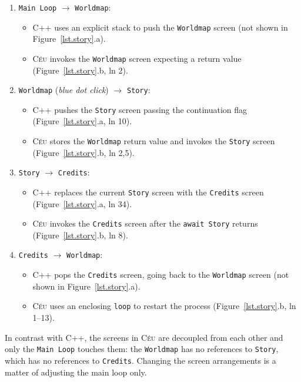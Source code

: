 \documentclass[times,twocolumn,final]{elsarticle}
\newcommand{\CEU}{\textsc{C\'{e}u}\xspace}
\newcommand{\code}[1] {{\small{\texttt{#1}}}}
\begin{document}
\begin{enumerate}
\item \code{Main Loop} $\longrightarrow$ \code{Worldmap}:
    \begin{itemize}
    \item C++ uses an explicit stack to push the \code{Worldmap} screen (not
          shown in Figure~\ref{lst.story}.a).
    \item \CEU invokes the \code{Worldmap} screen expecting a return value
          (Figure~\ref{lst.story}.b, ln 2).
    \end{itemize}
\item \code{Worldmap} (\emph{blue dot click}) $\longrightarrow$ \code{Story}:
    \begin{itemize}
    \item C++ pushes the \code{Story} screen passing the continuation flag
          (Figure~\ref{lst.story}.a, ln 10).
    \item \CEU stores the \code{Worldmap} return value and invokes the \code{Story} screen
          (Figure~\ref{lst.story}.b, ln 2,5).
    \end{itemize}
\item \code{Story} $\longrightarrow$ \code{Credits}:
    \begin{itemize}
    \item C++ replaces the current \code{Story} screen with the \code{Credits}
          screen (Figure~\ref{lst.story}.a, ln 34).
    \item \CEU invokes the \code{Credits} screen after the \code{await Story}
          returns (Figure~\ref{lst.story}.b, ln 8).
    \end{itemize}
\item \code{Credits} $\longrightarrow$ \code{Worldmap}:
    \begin{itemize}
    \item C++ pops the \code{Credits} screen, going back to the \code{Worldmap}
          screen (not shown in Figure~\ref{lst.story}.a).
    \item \CEU uses an enclosing \code{loop} to restart the process
          (Figure~\ref{lst.story}.b, ln 1--13).
    \end{itemize}
\end{enumerate}

In contrast with C++, the screens in \CEU are decoupled from each other and
only the \code{Main Loop} touches them: the \code{Worldmap} has no references
to \code{Story}, which has no references to \code{Credits}.
Changing the screen arrangements is a matter of adjusting the main loop only.
\end{document}
